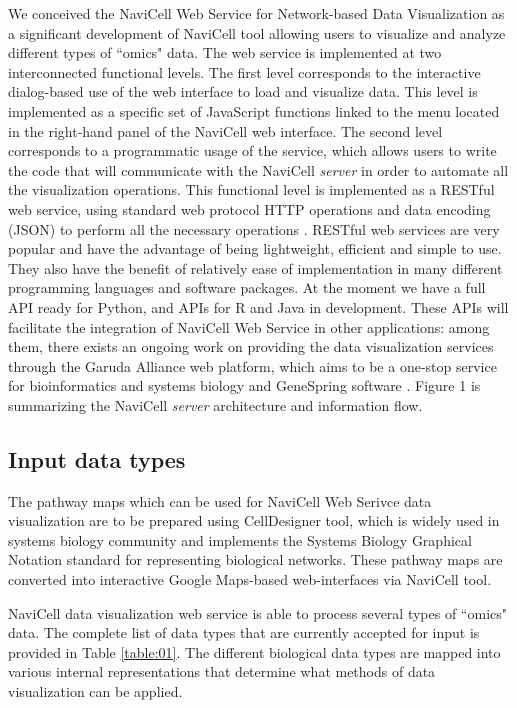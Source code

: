 \documentclass[a4,center,fleqn]{NAR}
\begin{document}
We conceived the NaviCell Web Service for Network-based Data Visualization
as a significant development of NaviCell tool \cite{kuperstein2013navicell} allowing
users to visualize and analyze different types of ``omics" data. The web service
is implemented at two interconnected functional levels.
The first level corresponds to the interactive dialog-based
use of the web interface to load and visualize data. This level is implemented
as a specific set of JavaScript functions linked to the menu located
in the right-hand panel of the NaviCell web interface. The second level corresponds to a
programmatic usage of the service, which allows users to write the code that will
communicate with the NaviCell \emph{server} in order to automate all the
visualization operations. This functional level is implemented as a RESTful web
service, using standard web protocol HTTP operations and data encoding (JSON)
to perform all the necessary operations \cite{fielding2002principled}.
RESTful web services are very popular and have the advantage of being
lightweight, efficient and simple to use. They also have the benefit of
relatively ease of implementation in many different programming languages and
software packages. At the moment we have a full API ready for Python, and
APIs for R and Java in development. These APIs will facilitate the integration
of NaviCell Web Service in other applications: among them, there exists an
ongoing work on providing the data visualization services through the Garuda
Alliance web platform, which aims to be a one-stop service for bioinformatics
and systems biology \cite{ghosh2011software} and GeneSpring software
\cite{Chu2001}. Figure 1 is summarizing the NaviCell \emph{server} architecture
and information flow.  

\subsection{Input data types}

The pathway maps which can be used for NaviCell Web Serivce data visualization
are to be prepared using CellDesigner tool\cite{Funahashi2008}, which is widely used in systems biology
community and implements the Systems Biology Graphical Notation standard \cite{LeNovere2009}
for representing biological networks. These pathway maps are converted into
interactive Google Maps-based web-interfaces via NaviCell tool\cite{kuperstein2013navicell}.

NaviCell data visualization web service is able to process
several types of ``omics" data. The complete list of data types that are
currently accepted for input is provided in Table \ref{table:01}. The different biological data
types are mapped into various internal representations that determine what methods
of data visualization can be applied.
\end{document}
